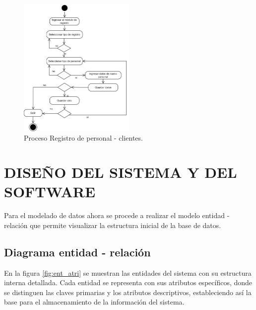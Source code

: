 	\begin{figure}[!h] %
		\caption[Diagrama de actividades - Registro de personal]
		{\newline Proceso Registro de personal - clientes.} %
		\centering
		\includegraphics[width=0.5\textwidth]{imagenes/cap_3/registro.drawio.png} %
		
		\begin{flushleft}
		\end{flushleft}
		\vspace{-16pt}
		\label{fig:DA_registro} %
	\end{figure}

\section{DISEÑO DEL SISTEMA Y DEL SOFTWARE}
	Para el modelado de datos ahora se procede a realizar el modelo entidad - relación que permite visualizar la estructura inicial de la base de datos.
	\subsection{Diagrama entidad - relación}
	En la figura \ref{fig:ent_atri} se muestran las entidades del sistema con su estructura interna detallada. Cada entidad se representa con sus atributos específicos, donde se distinguen las claves primarias y los atributos descriptivos, estableciendo así la base para el almacenamiento de la información del sistema.
	
